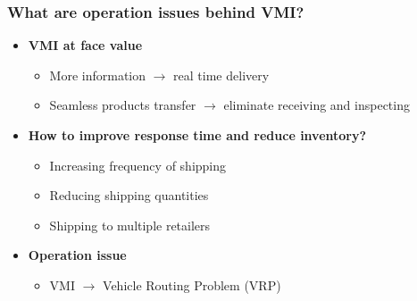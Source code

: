 \documentclass[10pt,handout,notes=show]{beamer}
\begin{document}
  \begin{frame}
  \frametitle{What are operation issues behind VMI?}

  \begin{itemize}
    \item<1-> \textbf{VMI at face value}
    \begin{itemize}
      \item<2-> More information $\rightarrow$ real time delivery
      \item<2-> Seamless products transfer $\rightarrow$ eliminate receiving and inspecting \NextLine
    \end{itemize}
    \item<1-> \textbf{How to improve response time and reduce inventory?}
    \begin{itemize}
      \item<3-> \alert{Increasing frequency} of shipping
      \item<3-> \alert{Reducing} shipping \alert{quantities}
      \item<3-> Shipping to \alert{multiple retailers} \NextLine
    \end{itemize}
    \item<1-> \textbf{Operation issue}
    \begin{itemize}
      \item<4-> VMI $\rightarrow$ Vehicle Routing Problem (VRP)
    \end{itemize}
  \end{itemize}


  \end{frame}
\end{document}
